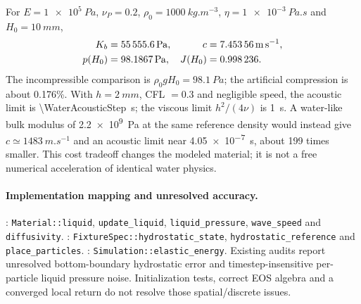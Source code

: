 For $E=\SI{1e5}{Pa}$, $\nu_P=0.2$, $\rho_0=\SI{1000}{kg.m^{-3}}$,
$\eta=\SI{1e-3}{Pa.s}$ and $H_0=\SI{10}{mm}$,
\begin{align}
 K_b&=\SI{55555.6}{Pa},&c&=\SI{7.45356}{m.s^{-1}},\\
 p(H_0)&=\SI{98.1867}{Pa},&J(H_0)&=\num{0.998236}.
\end{align}
The incompressible comparison is $\rho_0gH_0=\SI{98.1}{Pa}$; the artificial
compression is about 0.176\%. With $h=\SI{2}{mm}$, CFL $=0.3$ and negligible
speed, the acoustic limit is \SI{\WaterAcousticStep}{s}; the viscous limit
$h^2/(4\nu)$ is \SI{1}{s}. A water-like bulk modulus of \SI{2.2e9}{Pa} at
the same reference density would instead give $c\simeq\SI{1483}{m.s^{-1}}$
and an acoustic limit near \SI{4.05e-7}{s}, about 199 times smaller. This cost
tradeoff changes the modeled material; it is not a free numerical acceleration
of identical water physics.

\paragraph{Implementation mapping and unresolved accuracy.}
: \nolinkurl{Material::liquid},
\nolinkurl{update_liquid}, \nolinkurl{liquid_pressure}, \nolinkurl{wave_speed} and
\nolinkurl{diffusivity}. :
\nolinkurl{FixtureSpec::hydrostatic_state}, \nolinkurl{hydrostatic_reference} and
\nolinkurl{place_particles}. :
\nolinkurl{Simulation::elastic_energy}. Existing audits report unresolved
bottom-boundary hydrostatic error and timestep-insensitive per-particle liquid
pressure noise. Initialization tests, correct EOS algebra and a converged local
return do not resolve those spatial/discrete issues.
